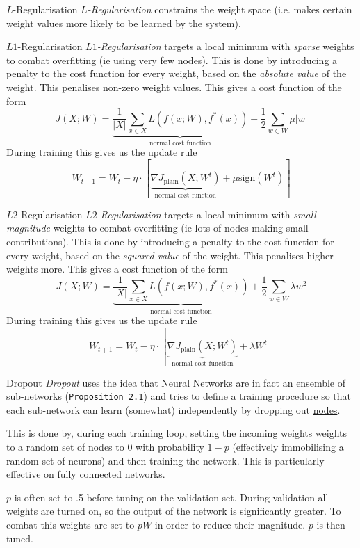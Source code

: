 \documentclass[11pt,a4paper]{article}
\begin{document}
\begin{definition}{$L$-Regularisation}
  \textit{$L$-Regularisation} constrains the weight space (i.e. makes certain weight values more likely to be learned by the system).
\end{definition}

\begin{definition}{$L1$-Regularisation}
  \textit{$L1$-Regularisation} targets a local minimum with \textit{sparse} weights to combat overfitting (ie using very few nodes). This is done by introducing a penalty to the cost function for every weight, based on the \textit{absolute value} of the weight. This penalises non-zero weight values. This gives a cost function of the form
  \[ J(X;W)=\underbrace{\frac1{|X|}\sum_{x\in X}L(f(x;W),f^*(x))}_\text{normal cost function}+\frac12\sum_{w\in W}\mu|w| \]
  During training this gives us the update rule
  \[ W_{t+1}=W_t-\eta\cdot\left[\underbrace{\nabla J_\text{plain}(X;W^t)}_\text{normal cost function}+\mu\text{sign}(W^t)\right] \]
\end{definition}

\begin{definition}{$L2$-Regularisation}
  \textit{$L2$-Regularisation} targets a local minimum with \textit{small-magnitude} weights to combat overfitting (ie lots of nodes making small contributions). This is done by introducing a penalty to the cost function for every weight, based on the \textit{squared value} of the weight. This penalises higher weights more. This gives a cost function of the form
  \[ J(X;W)=\underbrace{\frac1{|X|}\sum_{x\in X}L(f(x;W),f^*(x))}_\text{normal cost function}+\frac12\sum_{w\in W}\lambda w^2 \]
  During training this gives us the update rule
  \[ W_{t+1}=W_t-\eta\cdot\left[\underbrace{\nabla J_\text{plain}(X;W^t)}_\text{normal cost function}+\lambda W^t\right] \]
\end{definition}

\begin{definition}{Dropout}
  \textit{Dropout} uses the idea that Neural Networks are in fact an ensemble of sub-networks (\texttt{Proposition 2.1}) and tries to define a training procedure so that each sub-network can learn (somewhat) independently by dropping out \underline{nodes}.
  \par This is done by, during each training loop, setting the incoming weights weights to a random set of nodes to 0 with probability $1-p$ (effectively immobilising a random set of neurons) and then training the network. This is particularly effective on fully connected networks.
  \par $p$ is often set to .5 before tuning on the validation set. During validation all weights are turned on, so the output of the network is significantly greater. To combat this weights are set to $pW$ in order to reduce their magnitude. $p$ is then tuned.
\end{definition}
\end{document}
